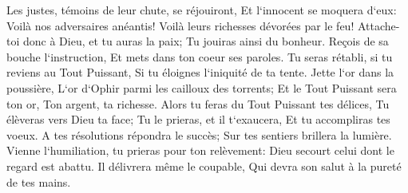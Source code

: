 \verse Les justes, témoins de leur chute, se réjouiront, Et l`innocent se moquera d`eux: 
\verse Voilà nos adversaires anéantis! Voilà leurs richesses dévorées par le feu! 
\verse Attache-toi donc à Dieu, et tu auras la paix; Tu jouiras ainsi du bonheur. 
\verse Reçois de sa bouche l`instruction, Et mets dans ton coeur ses paroles. 
\verse Tu seras rétabli, si tu reviens au Tout Puissant, Si tu éloignes l`iniquité de ta tente. 
\verse Jette l`or dans la poussière, L`or d`Ophir parmi les cailloux des torrents; 
\verse Et le Tout Puissant sera ton or, Ton argent, ta richesse. 
\verse Alors tu feras du Tout Puissant tes délices, Tu élèveras vers Dieu ta face; 
\verse Tu le prieras, et il t`exaucera, Et tu accompliras tes voeux. 
\verse A tes résolutions répondra le succès; Sur tes sentiers brillera la lumière. 
\verse Vienne l`humiliation, tu prieras pour ton relèvement: Dieu secourt celui dont le regard est abattu. 
\verse Il délivrera même le coupable, Qui devra son salut à la pureté de tes mains. 

